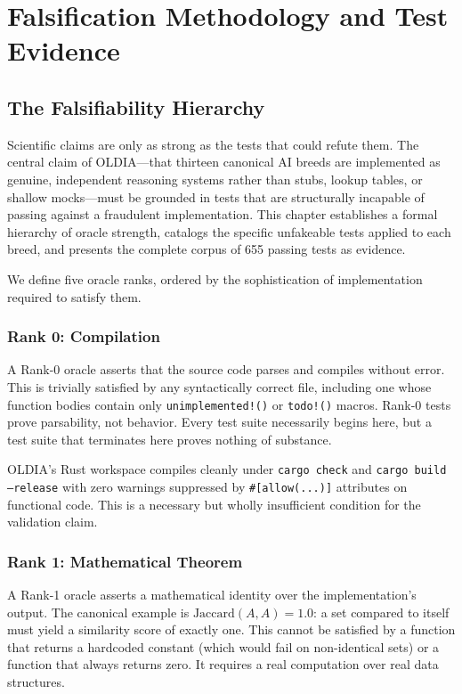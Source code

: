 \chapter{Falsification Methodology and Test Evidence}
\label{ch:falsification}

\section{The Falsifiability Hierarchy}
\label{sec:falsifiability-hierarchy}

Scientific claims are only as strong as the tests that could refute them. The central claim of
OLDIA---that thirteen canonical AI breeds are implemented as genuine, independent reasoning
systems rather than stubs, lookup tables, or shallow mocks---must be grounded in tests that
are structurally incapable of passing against a fraudulent implementation. This chapter
establishes a formal hierarchy of oracle strength, catalogs the specific unfakeable tests
applied to each breed, and presents the complete corpus of 655 passing tests as evidence.

We define five oracle ranks, ordered by the sophistication of implementation required to
satisfy them.

\subsection{Rank 0: Compilation}

A Rank-0 oracle asserts that the source code parses and compiles without error. This is
trivially satisfied by any syntactically correct file, including one whose function bodies
contain only \texttt{unimplemented!()} or \texttt{todo!()} macros. Rank-0 tests prove
parsability, not behavior. Every test suite necessarily begins here, but a test suite that
terminates here proves nothing of substance.

OLDIA's Rust workspace compiles cleanly under \texttt{cargo check} and \texttt{cargo build
--release} with zero warnings suppressed by \texttt{\#[allow(...)]} attributes on functional
code. This is a necessary but wholly insufficient condition for the validation claim.

\subsection{Rank 1: Mathematical Theorem}

A Rank-1 oracle asserts a mathematical identity over the implementation's output. The canonical
example is $\text{Jaccard}(A, A) = 1.0$: a set compared to itself must yield a similarity
score of exactly one. This cannot be satisfied by a function that returns a hardcoded constant
(which would fail on non-identical sets) or a function that always returns zero. It requires
a real computation over real data structures.

